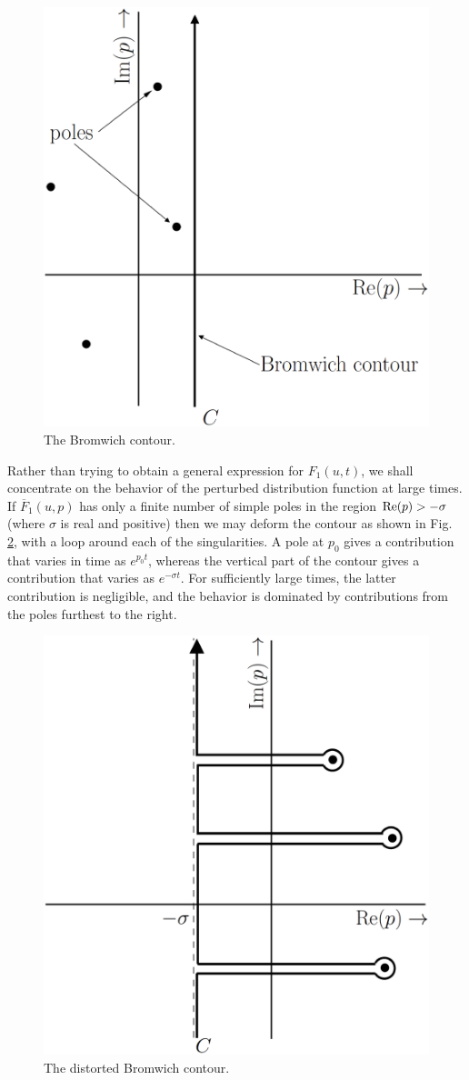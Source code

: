 \documentclass[12pt,a4paper]{article}
\begin{document}
\begin{figure}
\centering
\includegraphics[height=8.cm, angle=0]{Bromwich_contour.eps}
\caption{
The Bromwich contour.
}
\label{fig:Bromwich_c}
\end{figure}

Rather than trying to obtain a general expression for $F_1(u,t)$, we shall concentrate on the behavior of the perturbed distribution function at large times. If $\overline{F}_1(u, p)$ has only a finite number of simple poles in the region ${\rm Re}(p) > -\sigma$ (where $\sigma$ is real and positive) then we may deform the contour as shown in Fig. \ref{fig:dBromwich_c}, with a loop around each of the singularities. A pole at $p_0$ gives a contribution that varies in time as $e^{p_0 t}$, whereas the vertical part of the contour gives a contribution that varies as $e^{-\sigma t}$. For sufficiently large times, the latter contribution is negligible, and the behavior is dominated by contributions from the poles furthest to the right. 
 
 
\begin{figure}
\centering
\includegraphics[height=8.cm, angle=0]{distorted_Bromwich_contour.eps}
\caption{
The distorted Bromwich contour.
}
\label{fig:dBromwich_c}
\end{figure}
 
\end{document}

